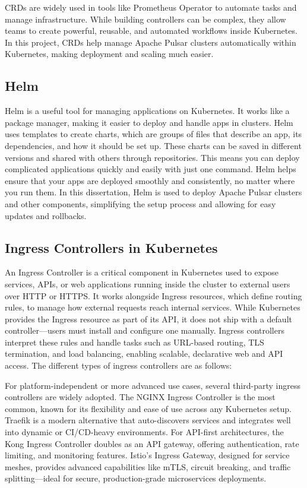 CRDs are widely used in tools like Prometheus Operator to automate tasks and manage infrastructure. While building controllers can be complex, they allow teams to create powerful, reusable, and automated workflows inside Kubernetes. In this project, CRDs help manage Apache Pulsar clusters automatically within Kubernetes, making deployment and scaling much easier.

\subsection{Helm}
Helm is a useful tool for managing applications on Kubernetes. It works like a package manager, making it easier to deploy and handle apps in clusters. Helm uses templates to create charts, which are groups of files that describe an app, its dependencies, and how it should be set up.
These charts can be saved in different versions and shared with others through repositories. This means you can deploy complicated applications quickly and easily with just one command. Helm helps ensure that your apps are deployed smoothly and consistently, no matter where you run them. In this dissertation, Helm is used to deploy Apache Pulsar clusters and other components, simplifying the setup process and allowing for easy updates and rollbacks.

\subsection{Ingress Controllers in Kubernetes}
An Ingress Controller is a critical component in Kubernetes used to expose services, APIs, or web applications running inside the cluster to external users over HTTP or HTTPS. It works alongside Ingress resources, which define routing rules, to manage how external requests reach internal services. While Kubernetes provides the Ingress resource as part of its API, it does not ship with a default controller—users must install and configure one manually. Ingress controllers interpret these rules and handle tasks such as URL-based routing, TLS termination, and load balancing, enabling scalable, declarative web and API access. The different types of ingress controllers are as follows:


For platform-independent or more advanced use cases, several third-party ingress controllers are widely adopted. The NGINX Ingress Controller is the most common, known for its flexibility and ease of use across any Kubernetes setup. Traefik is a modern alternative that auto-discovers services and integrates well into dynamic or CI/CD-heavy environments. For API-first architectures, the Kong Ingress Controller doubles as an API gateway, offering authentication, rate limiting, and monitoring features. Istio's Ingress Gateway, designed for service meshes, provides advanced capabilities like mTLS, circuit breaking, and traffic splitting—ideal for secure, production-grade microservices deployments.


